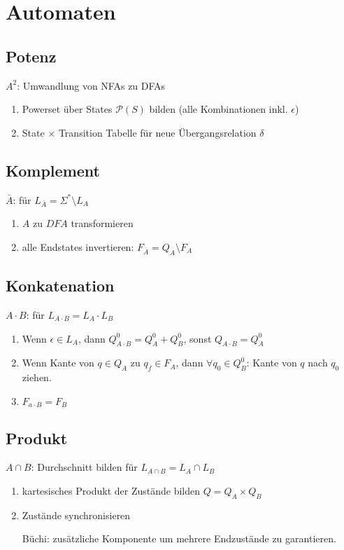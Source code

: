 \documentclass{article}
\author{Leopold Lemmermann}
\begin{document}
\createtitle

\section{Automaten}
\subsection{Potenz}
$A^2$: Umwandlung von NFAs zu DFAs

\begin{enumerate}
  \item Powerset über States $\mathcal{P}(S)$ bilden (alle Kombinationen inkl. $\epsilon$)
  \item State $\times$ Transition Tabelle für neue Übergangsrelation $\delta$
\end{enumerate}

\subsection{Komplement}
$\bar{A}$: für $L_{\bar{A}} =\Sigma^* \setminus L_A$

\begin{enumerate}
  \item $A$ zu $DFA$ transformieren
  \item alle Endstates invertieren: $F_{\bar{A}}=Q_A\setminus F_A$
\end{enumerate}

\subsection{Konkatenation}
$A\cdot B$: für $L_{A\cdot B}=L_A\cdot L_B$

\begin{enumerate}
  \item Wenn $\epsilon\in L_A$, dann $Q_{A\cdot B}^0=Q_A^0+Q_B^0$, sonst $Q_{A\cdot B}=Q_A^0$
  \item Wenn Kante von $q\in Q_A$ zu $q_f\in F_A$, dann $\forall q_0\in Q_B^0$: Kante von $q$ nach $q_0$ ziehen.
  \item $F_{a\cdot B}=F_B$
\end{enumerate}

\subsection{Produkt}
$A\cap B$: Durchschnitt bilden für $L_{A\cap B}=L_A\cap L_B$

\begin{enumerate}
  \item kartesisches Produkt der Zustände bilden $Q=Q_A\times Q_B$
  \item Zustände synchronisieren
  \item[Büchi:] zusätzliche Komponente um mehrere Endzustände zu garantieren.
\end{enumerate}
\end{document}
